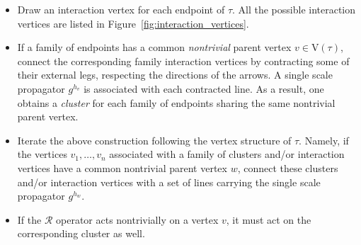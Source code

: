 \documentclass[a4paper, 11pt]{article}
\newcommand{\sing}[2]{{#1}^{#2}}							%
\newcommand{\ren}{\mathcal{R}}								%
\newcommand{\vrt}{\mathrm{V}}								%
\theoremstyle{thm}
\begin{document}
\begin{itemize}
\item Draw an interaction vertex for each endpoint of $\tau$. All the possible interaction vertices are listed in Figure~\ref{fig:interaction_vertices}.
\item If a family of endpoints has a common \emph{nontrivial} parent vertex $v \in \vrt(\tau)$, connect the corresponding family interaction vertices by contracting some of their external legs, respecting the directions of the arrows. A single scale propagator $\sing{g}{h_v}$ is associated with each contracted line. As a result, one obtains a \emph{cluster} for each family of endpoints sharing the same nontrivial parent vertex.
\item Iterate the above construction following the vertex structure of $\tau$. Namely, if the vertices $v_1, \dots, v_n$ associated with a family of clusters and/or interaction vertices have a common nontrivial parent vertex $w$, connect these clusters and/or interaction vertices with a set of lines carrying the single scale propagator $\sing{g}{h_w}$.
\item If the $\ren$ operator acts nontrivially on a vertex $v$, it must act on the corresponding cluster as well.
\end{itemize}
\end{document}
